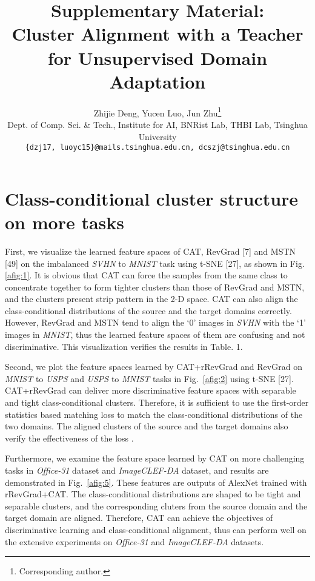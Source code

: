 \documentclass[10pt,twocolumn,letterpaper]{article}
\begin{document}
\title{Supplementary Material:\\
Cluster Alignment with a Teacher for Unsupervised Domain Adaptation}

\author{Zhijie Deng, Yucen Luo, Jun Zhu\thanks{Corresponding author.}\\
Dept. of Comp. Sci. \& Tech., Institute for AI, BNRist Lab, THBI Lab, Tsinghua University\\
{\tt\small \{dzj17, luoyc15\}@mails.tsinghua.edu.cn, dcszj@tsinghua.edu.cn}
}

\maketitle
\ificcvfinal\thispagestyle{empty}\fi

\appendix

\section{Class-conditional cluster structure on more tasks}

First, we visualize the learned feature spaces of CAT, RevGrad [7] and MSTN [49] on the imbalanced \emph{SVHN} to \emph{MNIST} task using t-SNE [27], as shown in Fig.\ref{afig:1}. It is obvious that CAT can force the samples from the same class to concentrate together to form tighter clusters than those of RevGrad and MSTN, and the clusters present strip pattern in the 2-D space. CAT can also align the class-conditional distributions of the source and the target domains correctly. However, RevGrad and MSTN tend to align the `0' images in \emph{SVHN} with the `1' images in \emph{MNIST}, thus the learned feature spaces of them are confusing and not discriminative. This visualization verifies the results in Table. 1.

Second, we plot the feature spaces learned by CAT+rRevGrad and RevGrad on \emph{MNIST} to \emph{USPS} and \emph{USPS} to \emph{MNIST} tasks in Fig.~\ref{afig:2} using t-SNE [27]. CAT+rRevGrad can deliver more discriminative feature spaces with separable and tight class-conditional clusters. Therefore, it is sufficient to use the first-order statistics based matching loss  to match the class-conditional distributions of the two domains. The aligned clusters of the source and the target domains also verify the effectiveness of the loss .

Furthermore, we examine the feature space learned by CAT on more challenging tasks in \emph{Office-31} dataset and \emph{ImageCLEF-DA} dataset, and results are demonstrated in Fig.~\ref{afig:5}. These features are outputs of AlexNet trained with rRevGrad+CAT. The class-conditional distributions are shaped to be tight and separable clusters, and the corresponding cluters from the source domain and the target domain are aligned. Therefore, CAT can achieve the objectives of discriminative learning and class-conditional alignment, thus can perform well on the extensive experiments on \emph{Office-31} and \emph{ImageCLEF-DA} datasets.
\end{document}
